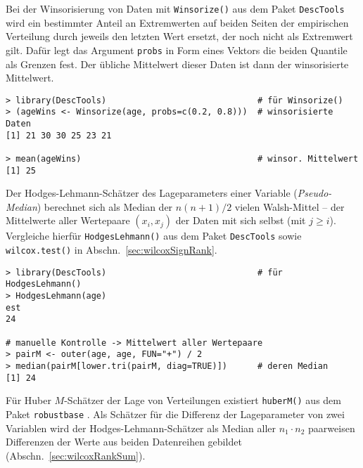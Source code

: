 Bei der Winsorisierung von Daten mit \lstinline!Winsorize()! aus dem Paket \lstinline!DescTools! wird ein bestimmter Anteil an Extremwerten auf beiden Seiten der empirischen Verteilung durch jeweils den letzten Wert ersetzt, der noch nicht als Extremwert gilt. Dafür legt das Argument \lstinline!probs! in Form eines Vektors die beiden Quantile als Grenzen fest. Der übliche Mittelwert dieser Daten ist dann der winsorisierte Mittelwert.
\begin{lstlisting}
> library(DescTools)                              # für Winsorize()
> (ageWins <- Winsorize(age, probs=c(0.2, 0.8)))  # winsorisierte Daten
[1] 21 30 30 25 23 21

> mean(ageWins)                                   # winsor. Mittelwert
[1] 25
\end{lstlisting}

Der Hodges-Lehmann-Schätzer des Lageparameters einer Variable (\emph{Pseudo-Median}) berechnet sich als Median der $n (n+1) / 2$ vielen Walsh-Mittel -- der Mittelwerte aller Wertepaare $(x_{i}, x_{j})$ der Daten mit sich selbst (mit $j \geq i$). Vergleiche hierfür  \lstinline!HodgesLehmann()! aus dem Paket \lstinline!DescTools! sowie \lstinline!wilcox.test()! in Abschn.\ \ref{sec:wilcoxSignRank}.
\begin{lstlisting}
> library(DescTools)                              # für HodgesLehmann()
> HodgesLehmann(age)
est
24

# manuelle Kontrolle -> Mittelwert aller Wertepaare
> pairM <- outer(age, age, FUN="+") / 2
> median(pairM[lower.tri(pairM, diag=TRUE)])      # deren Median
[1] 24
\end{lstlisting}

Für Huber $M$-Schätzer der Lage von Verteilungen existiert \lstinline!huberM()! aus dem Paket \lstinline!robustbase! \cite{Rousseeuw2009}. Als Schätzer für die Differenz der Lageparameter von zwei Variablen wird der Hodges-Lehmann-Schätzer als Median aller $n_{1} \cdot n_{2}$ paarweisen Differenzen der Werte aus beiden Datenreihen gebildet (Abschn.\ \ref{sec:wilcoxRankSum}).

